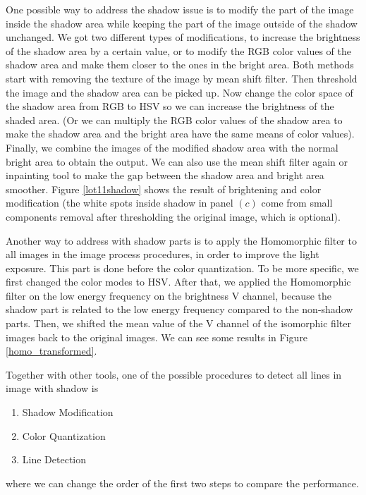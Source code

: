 \documentclass{m2pi}
\begin{document}
One possible way to address the shadow issue is to modify the part of the image inside the shadow area while keeping the part of the image outside of the shadow unchanged. We got two different types of modifications, to increase the brightness of the shadow area by a certain value, or to modify the RGB color values of the shadow area and make them closer to the ones in the bright area. Both methods start with 
removing the texture of the image by mean shift filter. Then threshold the image and the shadow area can be picked up. Now change the color space of the shadow area from RGB to HSV so we can increase the brightness of the shaded area. (Or we can multiply the RGB color values of the shadow area to make the shadow area and the bright area have the same means of color values). Finally, we combine the images of the modified shadow area with the normal bright area to obtain the output. We can also use the mean shift filter again or inpainting tool to make the gap between the shadow area and bright area smoother. Figure \ref{lot11shadow} shows the result of brightening and color modification (the white spots inside shadow in panel $(c)$ come from small components removal after thresholding the original image, which is optional).

Another way to address with shadow parts is to apply the Homomorphic filter \cite{glasgio} to all images in the image process procedures, in order to improve the light exposure. This part is done before the color quantization. To be more specific, we first changed the color modes to HSV.
After that, we applied the Homomorphic filter on the low energy frequency on the brightness V channel, because the shadow part is related to the low energy frequency compared to the non-shadow parts. Then, we shifted the mean value of the V channel of the isomorphic filter images back to the original images.   We can see some results in Figure \ref{homo_transformed}. 

Together with other tools, one of the possible procedures to detect all lines in image with shadow is
\begin{enumerate}
    \item Shadow Modification
    \item Color Quantization
    \item Line Detection
\end{enumerate}
where we can change the order of the first two steps to compare the performance.
\end{document}
